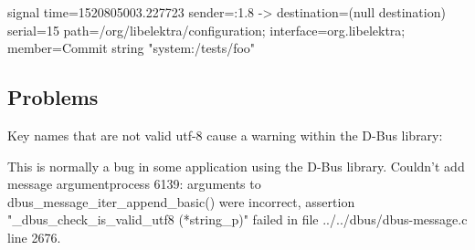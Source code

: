 \begin{DoxyCode}
signal time=1520805003.227723 sender=:1.8 -> destination=(null destination) serial=15
       path=/org/libelektra/configuration; interface=org.libelektra; member=Commit
   string "system:/tests/foo"
\end{DoxyCode}
\hypertarget{autotoc_md153_autotoc_md165}{}\subsection{Problems}\label{autotoc_md153_autotoc_md165}
Key names that are not valid utf-\/8 cause a warning within the D-\/\+Bus library\+:


\begin{DoxyCode}
This is normally a bug in some application using the D-Bus library.
Couldn't add message argumentprocess 6139: arguments to dbus\_message\_iter\_append\_basic() were incorrect,
       assertion "\_dbus\_check\_is\_valid\_utf8 (*string\_p)" failed in file ../../dbus/dbus-message.c line 2676.
\end{DoxyCode}
 